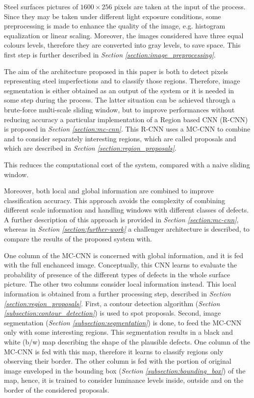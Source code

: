     \par{
        Steel surfaces pictures of $1600\times 256$ pixels are taken at the input of the process. Since they may be taken under different light exposure conditions, some preprocessing is made to enhance the quality of the image, e.g. histogram equalization or linear scaling. Moreover, the images considered have three equal colours levels, therefore they are converted into gray levels, to save space. This first step is further described in \emph{Section \ref{section:image_preprocessing}}.
    }
    \par{
        The aim of the architecture proposed in this paper is both to detect pixels representing steel imperfections and to classify those regions. Therefore, image segmentation is either obtained as an output of the system or it is needed in some step during the process. The latter situation can be achieved through a brute-force multi-scale sliding window, but to improve performances without reducing accuracy a particular implementation of a Region based CNN (R-CNN) \cite{ieee:7410526,ieee:7532516} is proposed in \emph{Section \ref{section:mc-cnn}}. This R-CNN uses a MC-CNN to combine and to consider separately interesting regions, which are called proposals and which are described in \emph{Section \ref{section:region_proposals}}.
    }
    \par{
        This reduces the computational cost of the system, compared with a naive sliding window.
    }
    \par{
        Moreover, both local and global information are combined to improve classification accuracy. This approach avoids the complexity of combining different scale information and handling windows with different classes of defects. A further description of this approach is provided in \emph{Section \ref{section:mc-cnn}}, whereas in \emph{Section \ref{section:further-work}} a challenger architecture is described, to compare the results of the proposed system with.
    }
    \par{
        One column of the MC-CNN is concerned with global information, and it is fed with the full enchanced image. Conceptually, this CNN learns to evaluate the probability of presence of the different types of defects in the whole surface picture. The other two columns consider local information instead. This local information is obtained from a further processing step, described in \emph{Section \ref{section:region_proposals}}. First, a contour detection algorithm (\emph{Section \ref{subsection:contour_detection}}) is used to spot proposals. Second, image segmentation (\emph{Section \ref{subsection:segmentation}}) is done, to feed the MC-CNN only with some interesting regions. This segmentation results in a black and white (b/w) map describing the shape of the plausible defects. One column of the MC-CNN is fed with this map, therefore it learns to classify regions only observing their border. The other column is fed with the portion of original image enveloped in the bounding box (\emph{Section \ref{subsection:bounding_box}}) of the map, hence, it is trained to consider luminance levels inside, outside and on the border of the considered proposals.
    }

